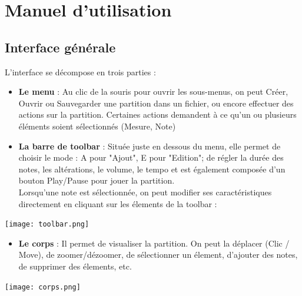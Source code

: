 \documentclass[12pt]{report}
\begin{document}
\chapter{Manuel d'utilisation}
\section{Interface générale}
L'interface se décompose en trois parties :\\
\begin{itemize}
 \item \textbf{Le menu} : Au clic de la souris pour ouvrir les sous-menus, on peut Créer, Ouvrir ou Sauvegarder une partition dans un fichier, ou encore effectuer des actions sur la partition. Certaines actions
 demandent à ce qu'un ou plusieurs éléments soient sélectionnés (Mesure, Note)  \\
 \item \textbf{La barre de toolbar} : Située juste en dessous du menu, elle permet de choisir le mode : A pour "Ajout", E pour "Edition"; de régler la durée des notes, les altérations, le volume, le tempo et est
 également composée d'un bouton Play/Pause pour jouer la partition.\\
 Lorsqu'une note est sélectionnée, on peut modifier ses caractéristiques directement en cliquant sur les élements de la toolbar :
 \end{itemize}
 \begin{center}
 \texttt{[image: toolbar.png]}\\
 \end{center}
 \newpage
 \begin{itemize}
 \item \textbf{Le corps} : Il permet de visualiser la partition. On peut la déplacer (Clic / Move), de zoomer/dézoomer, de sélectionner un élement, d'ajouter des notes, de supprimer des élements, etc.
 \end{itemize}
 \begin{center}
 \texttt{[image: corps.png]}\\
 \end{center}
 \vskip 0.2in
\end{document}
